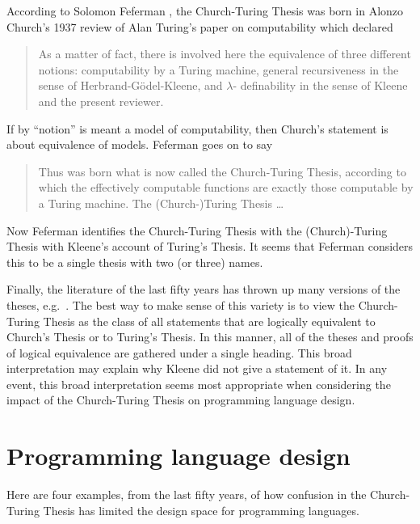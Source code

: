 \documentclass[a4paper]{article}
\begin{document}
According to Solomon Feferman \cite{Feferman06}, the Church-Turing
Thesis was born in Alonzo Church's 1937 review of Alan Turing's paper
on computability \cite{Turing36} which declared
\begin{quote}
  As a matter of fact, there is involved here the equivalence of three
  different notions: computability by a Turing machine, general
  recursiveness in the sense of Herbrand-G\"odel-Kleene, and $\lambda$-
  definability in the sense of Kleene and the present reviewer.
\end{quote}
If by ``notion'' is meant a model of computability, then Church's
statement is about equivalence of models. Feferman goes on to say
\begin{quote}
Thus was born what is now called the Church-Turing Thesis, according
to which the effectively computable functions are exactly those
computable by a Turing machine.  The (Church-)Turing Thesis \ldots 
\end{quote}
Now Feferman identifies the Church-Turing Thesis with the
(Church)-Turing Thesis with Kleene's account of Turing's Thesis. It
seems that Feferman considers this to be a single thesis with two (or
three) names.

Finally, the literature of the last fifty years has thrown up many
versions of the theses, e.g.\ \cite{gandy, Soare96,BarendregtM13}. The
best way to make sense of this variety is to view the Church-Turing
Thesis as the class of all statements that are logically equivalent to
Church's Thesis or to Turing's Thesis.  In this manner, all of the
theses and proofs of logical equivalence are gathered under a single
heading.  This broad interpretation may explain why Kleene did not
give a statement of it.  In any event, this broad interpretation seems
most appropriate when considering the impact of the Church-Turing
Thesis on programming language design.


\section{Programming language design} 
\label{sec:design}

Here are four examples, from the last fifty years, of how confusion in the
Church-Turing Thesis has limited the design space for programming
languages.
\end{document}

